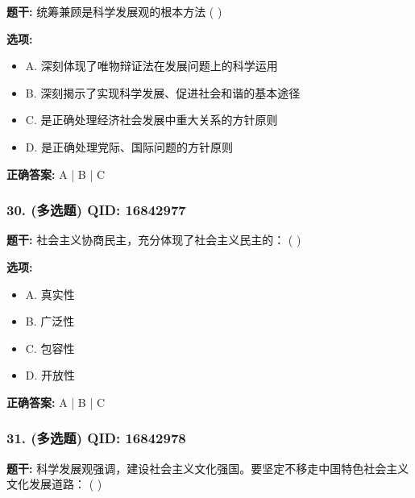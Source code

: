 \documentclass[12pt,UTF8]{ctexart}
\begin{document}
\textbf{题干:}
统筹兼顾是科学发展观的根本方法 ( )

\textbf{选项:}
\begin{itemize}[leftmargin=*]

  \item A. 深刻体现了唯物辩证法在发展问题上的科学运用

  \item B. 深刻揭示了实现科学发展、促进社会和谐的基本途径

  \item C. 是正确处理经济社会发展中重大关系的方针原则

  \item D. 是正确处理党际、国际问题的方针原则

\end{itemize}

\textbf{正确答案:}
A | B | C

\vspace{0.3em}\hrulefill\vspace{0.7em}

\subsubsection*{30. (多选题) \small QID: 16842977}

\textbf{题干:}
社会主义协商民主，充分体现了社会主义民主的： ( )

\textbf{选项:}
\begin{itemize}[leftmargin=*]

  \item A. 真实性

  \item B. 广泛性

  \item C. 包容性

  \item D. 开放性

\end{itemize}

\textbf{正确答案:}
A | B | C

\vspace{0.3em}\hrulefill\vspace{0.7em}

\subsubsection*{31. (多选题) \small QID: 16842978}

\textbf{题干:}
科学发展观强调，建设社会主义文化强国。要坚定不移走中国特色社会主义文化发展道路： ( )
\end{document}
